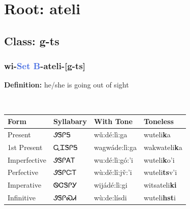 \needspace{4in}
\section*{Root: ateli}
\nopagebreak
{}
\needspace{3in}
\subsection*{Class: g-ts}
\nopagebreak
\needspace{2in}
\subsubsection*{wi{-}\textcolor{RoyalBlue}{Set B}{-}\textbf{ateli}{-}[g-ts]}
\nopagebreak
\textbf{Definition: } he/she is going out of sight
\\[0.5em]
\begin{tabularx}{\textwidth}{l X X X}%
\toprule%
\textbf{Form}&\textbf{Syllabary}&\textbf{With Tone}&\textbf{Toneless}\\%
\midrule%
Present&ᏭᏕᎵᎦ&wǔ:dé:lì:ga&wuteli\textbf{k}a\\%
1st Present&ᏩᏆᏕᎵᎦ&wagwáde:lì:ga&wakwateli\textbf{k}a\\%
Imperfective&ᏭᏕᎵᎪᎢ&wu:dé:lì:gó:’i&wuteli\textbf{k}o'i\\%
Perfective&ᏭᏕᎵᏨᎢ&wù:dě:lî:jv̌:’i&wuteli\textbf{ts}v'i\\%
Imperative&ᏫᏣᏕᎵᎩ&wijádé:lì:gi&witsateli\textbf{ki}\\%
Infinitive&ᏭᏕᎵᏍᏗ&wù:de:lísdi&wuteli\textbf{hst}i\\%
\bottomrule%
\end{tabularx}
\\[1em]